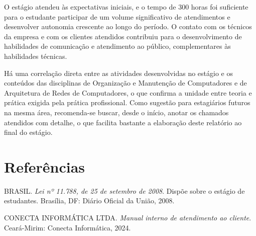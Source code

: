 \documentclass[article,12pt,a4paper,oneside]{abntex2}
\begin{document}
O estágio atendeu às expectativas iniciais, e o tempo de 300 horas foi
suficiente para o estudante participar de um volume significativo de
atendimentos e desenvolver autonomia crescente ao longo do período. O
contato com os técnicos da empresa e com os clientes atendidos contribuiu
para o desenvolvimento de habilidades de comunicação e atendimento ao
público, complementares às habilidades técnicas.

Há uma correlação direta entre as atividades desenvolvidas no estágio e os
conteúdos das disciplinas de Organização e Manutenção de Computadores e de
Arquitetura de Redes de Computadores, o que confirma a unidade entre
teoria e prática exigida pela prática profissional. Como sugestão para
estagiários futuros na mesma área, recomenda-se buscar, desde o início,
anotar os chamados atendidos com detalhe, o que facilita bastante a
elaboração deste relatório ao final do estágio.

\postextual

\section*{Referências}

\newcommand{\referencia}[1]{\par\noindent\hangindent=1cm #1\par\medskip}

\referencia{BRASIL. \textit{Lei nº 11.788, de 25 de setembro de 2008}.
Dispõe sobre o estágio de estudantes. Brasília, DF: Diário Oficial da
União, 2008.}

\referencia{CONECTA INFORMÁTICA LTDA. \textit{Manual interno de
atendimento ao cliente}. Ceará-Mirim: Conecta Informática, 2024.}
\end{document}
